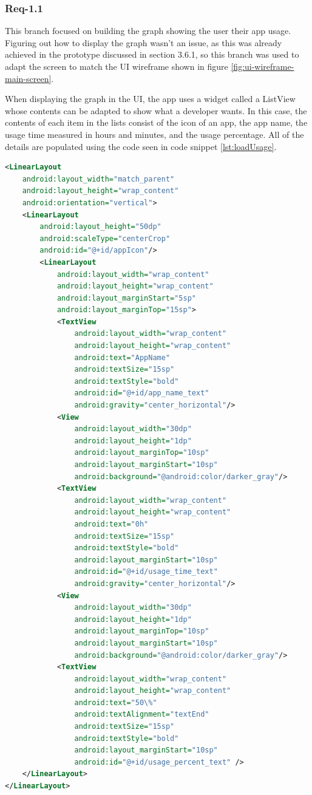 \documentclass[12pt]{article}
\begin{document}
\subsubsection{Req-1.1}
This branch focused on building the graph showing the user their app usage. Figuring out how to display the graph wasn't an issue, as this was already achieved in the prototype discussed in 
section 3.6.1, so this branch was used to adapt the screen to match the UI wireframe shown in figure \ref{fig:ui-wireframe-main-screen}. \newline

When displaying the graph in the UI, the app uses a widget called a ListView whose contents can be adapted to show what a developer wants. In this case, the contents of each item in the lists 
consist of the icon of an app, the app name, the usage time measured in hours and minutes, and the usage percentage. All of the details are populated using the code seen in code snippet
\ref{lst:loadUsage}.

\begin{lstlisting}[language=XML, style=mystyle, caption={XML code used by the ListView widget for displaying code}, label=lst:appdetailswidget]
<LinearLayout
	android:layout_width="match_parent"
	android:layout_height="wrap_content"
	android:orientation="vertical">
	<LinearLayout
		android:layout_height="50dp"
		android:scaleType="centerCrop"
		android:id="@+id/appIcon"/>
		<LinearLayout
			android:layout_width="wrap_content"
			android:layout_height="wrap_content"
			android:layout_marginStart="5sp"
			android:layout_marginTop="15sp">
			<TextView
				android:layout_width="wrap_content"
				android:layout_height="wrap_content"
				android:text="AppName"
				android:textSize="15sp"
				android:textStyle="bold"
				android:id="@+id/app_name_text"
				android:gravity="center_horizontal"/>
			<View
				android:layout_width="30dp"
				android:layout_height="1dp"
				android:layout_marginTop="10sp"
				android:layout_marginStart="10sp"
				android:background="@android:color/darker_gray"/>
			<TextView
				android:layout_width="wrap_content"
				android:layout_height="wrap_content"
				android:text="0h"
				android:textSize="15sp"
				android:textStyle="bold"
				android:layout_marginStart="10sp"
				android:id="@+id/usage_time_text"
				android:gravity="center_horizontal"/>
			<View
				android:layout_width="30dp"
				android:layout_height="1dp"
				android:layout_marginTop="10sp"
				android:layout_marginStart="10sp"
				android:background="@android:color/darker_gray"/>
			<TextView
				android:layout_width="wrap_content"
				android:layout_height="wrap_content"
				android:text="50\%"
				android:textAlignment="textEnd"
				android:textSize="15sp"
				android:textStyle="bold"
				android:layout_marginStart="10sp"
				android:id="@+id/usage_percent_text" />
	</LinearLayout>
</LinearLayout>
\end{lstlisting}
\end{document}
